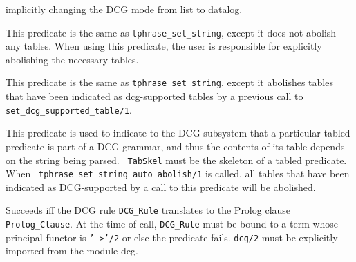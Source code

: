 \begin{description}
\noindent
implicitly changing the DCG mode from list to datalog.

This predicate is the same as {\tt tphrase\_set\_string}, except
it does not abolish any tables.  When using this predicate, the
user is responsible for explicitly abolishing the necessary tables.

This predicate is the same as {\tt tphrase\_set\_string}, except
it abolishes tables that have been indicated as dcg-supported tables
by a previous call to {\tt set\_dcg\_supported\_table/1}.

This predicate is used to indicate to the DCG subsystem that a
particular tabled predicate is part of a DCG grammar, and thus the
contents of its table depends on the string being parsed.  {\tt
TabSkel} must be the skeleton of a tabled predicate.  When {\tt
tphrase\_set\_string\_auto\_abolish/1} is called, all tables that have
been indicated as DCG-supported by a call to this predicate will be
abolished.

    Succeeds iff the DCG rule {\tt DCG\_Rule} translates to the Prolog
    clause {\tt Prolog\_Clause}.  At the time of call, {\tt DCG\_Rule}
    must be bound to a term whose principal functor is {\tt '-->'/2}
    or else the predicate fails.  {\tt dcg/2} must be explicitly
    imported from the module {\sf dcg}.

\end{description}


